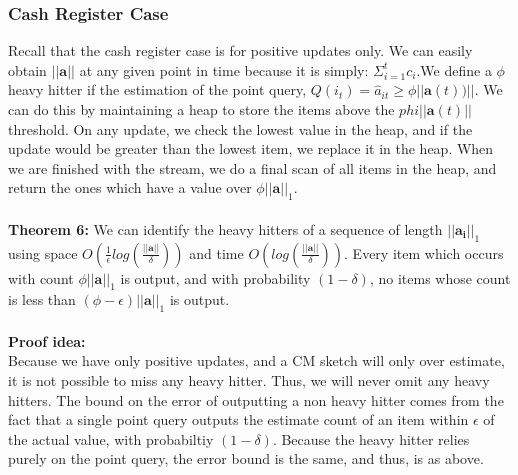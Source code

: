 \documentclass[11pt]{article}
\begin{document}
\subsubsection{Cash Register Case}
Recall that the cash register case is for positive updates only. We can easily obtain $||\bm{a}||$ at any given point in time because it is simply: $\Sigma_{i=1}^t c_i$.We define a $\phi$ heavy hitter if the estimation of the point query, $Q(i_t) =  \hat a_{it} \geq \phi ||\bm{a}(t))||$. We can do this by maintaining a heap to store the items above the $phi||\bm{a}(t)||$ threshold. On any update, we check the lowest value in the heap, and if the update would be greater than the lowest item, we replace it in the heap. When we are finished with the stream, we do a final scan of all items in the heap, and return the ones which have a value over $\phi||\bm{a}||_1$.\\\\
\textbf{Theorem 6: } We can identify the heavy hitters of a sequence of length $||\bm{a_i}||_1$ using space $O(\frac{1}{\epsilon}log(\frac{||\bm{a}||}{\delta}))$ and time $O(log(\frac{||\bm{a}||}{\delta}))$. Every item which occurs with count $\phi ||\bm{a}||_1$ is output, and with probability $(1-\delta)$, no items whose count is less than $(\phi - \epsilon)||\bm{a}||_1$ is output.\\\\

\textbf{Proof idea:}\\
Because we have only positive updates, and a CM sketch will only over estimate,
it is not possible to miss any heavy hitter. Thus, we will never omit any heavy
hitters. The bound on the error of outputting a non heavy hitter comes from the
fact that a single point query outputs the estimate count of an item within
$\epsilon$ of the actual value, with probabiltiy $(1-\delta)$. Because the heavy
hitter relies purely on the point query, the error bound is the same, and thus,
is as above.\\\\
\end{document}
